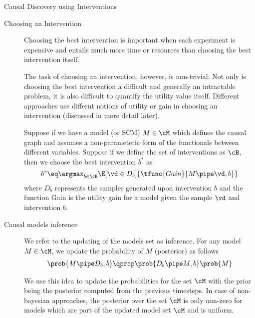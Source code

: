 \documentclass[10pt]{article}
\begin{document}
\begin{psection}[4]{Causal Discovery using Interventions}
    \begin{description}
        \item[Choosing an Intervention]
            Choosing the best intervention is important when each experiment is
            expensive and entails much more time or resources than choosing the best
            intervention itself.

            The task of choosing an intervention, however, is non-trivial. Not only is
            choosing the best intervention a difficult and generally an intractable
            problem, it is also difficult to quantify the utility value itself.
            Different approaches use differnt notions of utility or gain in choosing an
            intervention (discussed in more detail later).

            Suppose if we have a model (or SCM) $M \in \cM$ which defines the causal
            graph and assumes a non-parameteric form of the functionals between
            different variables. Suppose if we define the set of interventions as $\cB$,
            then we choose the best intervention $b^\ast$ as
            \begin{equation}
                b^\ast \eq \argmax_{b \in \cB} \E[\vd \in D_b]{\tfunc{Gain}{M \pipe \vd, b}}
            \end{equation}
            where $D_b$ represents the samples generated upon intervention $b$ and the
            function Gain is the utility gain for a model given the sample $\vd$ and
            intervention $b$.

        \item[Causal models inference] 
            We refer to the updating of the models set as inference. For any model
            $M \in \cM$, we update the probability of $M$ (posterior) as follows
            \begin{align*}
                \prob{M \pipe D_b, b} \qprop \prob{D_b \pipe M, b} \prob{M}
            \end{align*}
            
            We use this idea to update the probabilities for the set $\cM$ with the
            prior being the posterior computed from the previous timesteps. In case
            of non-bayesian approaches, the posterior over the set $\cM$ is only
            non-zero for models which are part of the updated model set $\cM$ and is
            uniform.

    \end{description}


\end{psection}
\end{document}

